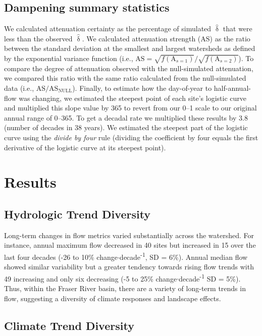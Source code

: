 \documentclass{AGUJournal}
\begin{document}
\subsection{Dampening summary statistics}

We calculated attenuation certainty as the percentage of simulated $\hat{\updelta}$ that were less than the observed $\hat{\updelta}$. We calculated attenuation strength ($\mathrm{AS}$) as the ratio between the standard deviation at the smallest and largest watersheds as defined by the exponential variance function (i.e., $\mathrm{AS}=\sqrt{f(\mathrm{A}_{s=1})} / \sqrt{f(\mathrm{A}_{s=2})}$). To compare the degree of attenuation observed with the null-simulated attenuation, we compared this ratio with the same ratio calculated from the null-simulated data (i.e., $\mathrm{AS} / \mathrm{AS_{NULL}}$). Finally, to estimate how the day-of-year to half-annual-flow was changing, we estimated the steepest point of each site's logistic curve and multiplied this slope value by 365 to revert from our 0--1 scale to our original annual range of 0--365. To get a decadal rate we multiplied these results by 3.8 (number of decades in 38 years). We estimated the steepest part of the logistic curve using the \textit{divide by four} rule \citep{Gelman:2008} (dividing the coefficient by four equals the first derivative of the logistic curve at its steepest point).

\section{Results}

\subsection{Hydrologic Trend Diversity}

Long-term changes in flow metrics varied substantially across the watershed. For instance, annual maximum flow decreased in 40 sites but increased in 15 over the last four decades (-26 to 10\% change$\cdot$decade\textsuperscript{-1}, SD = 6\%). Annual median flow showed similar variability but a greater tendency towards rising flow trends with 49 increasing and only six decreasing (-5 to 25\% change$\cdot$decade\textsuperscript{-1} SD = 5\%). Thus, within the Fraser River basin, there are a variety of long-term trends in flow, suggesting a diversity of climate responses and landscape effects.

\subsection{Climate Trend Diversity}
\end{document}
